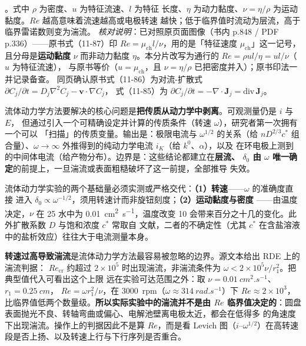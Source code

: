 。式中 $\rho$ 为密度、$u$ 为特征流速、$l$ 为特征
长度、$\eta$ 为动力黏度、$\nu=\eta/\rho$ 为运动黏度。$Re$ 越高意味着流速越高或电极转速
越快；低于临界值时流动为层流，高于临界雷诺数则变为湍流。
\emph{核对说明}：已对照原页面图像（书内 p.848 / PDF p.336）——原书式（11-87）印
$Re=\mu_{\mathrm{ch}}l/\nu$，用的是「特征速度 $\mu_{\mathrm{ch}}$」这一记号，且分母是\textbf{运动黏度}
$\nu$ 而非动力黏度 $\eta$。本分片改写为通行的 $Re=\rho ul/\eta=ul/\nu$（$u$ 为特征流速），
与原书等价（$u=\mu_{\mathrm{ch}}$，且 $\nu=\eta/\rho$ 已把密度并入）；原书印法一并记录备查。
同页确认原书式（11-86）为对流-扩散式 $\partial C_j/\partial t=D_j\nabla^2C_j-\mathbf{v}\cdot\nabla C_j$，
式（11-85）为 $\partial C_j/\partial t=-\nabla\cdot\mathbf{J}_j=\mathrm{div}\,\mathbf{J}_j$。

\begin{probout}
流体动力学方法要解决的核心问题是\textbf{把传质从动力学中剥离}。可观测量仍是 $i$ 与 $E$，
但通过引入一个可精确设定并计算的传质条件（转速 $\omega$），研究者第一次拥有一个可以
「扫描」的传质变量。输出是：极限电流与 $\omega^{1/2}$ 的关系（给 $nD^{2/3}c^{*}$
组合量）、$\omega\to\infty$ 外推得到的纯动力学电流 $i_K$（给 $k^{0}$、$\alpha$），以及
在环电极上测到的中间体电流（给产物分布）。边界是：这些结论都建立在\textbf{层流、
$\delta_0$ 由 $\omega$ 唯一确定}的前提上，一旦湍流或表面粗糙破坏了这一前提，全部推导
失效。
\end{probout}

\begin{measure}
流体动力学实验的两个基础量必须实测或严格交代：\textbf{（1）转速}——$\omega$ 的准确度直接
进入 $\delta_0\propto\omega^{-1/2}$，须用转速计而非旋钮刻度；\textbf{（2）运动黏度与密度}
——由温度决定，$\nu$ 在 \qty{25}{\degC} 水中为 \qty{0.01}{cm^2.s^{-1}}，温度改变
\qty{10}{\degC} 会带来百分之十几的变化。此外扩散系数 $D$ 与饱和浓度 $c^{*}$ 常取自
文献，二者的不确定性（尤其 $c^{*}$ 在含盐溶液中的盐析效应）往往大于电流测量本身。
\end{measure}

\begin{pitfall}
\textbf{转速过高导致湍流}是流体动力学方法最容易被忽略的边界。源文本给出 RDE 上的湍流判据：
$Re_{\mathrm{cr}}$ 约超过 $2\times10^{5}$ 时出现湍流，非湍流条件为
$\omega<2\times10^{5}\nu/r_1^{2}$。把典型值代入可看出这个上限
远在实验可达范围之外：取 $\nu=\qty{0.01}{cm^2.s^{-1}}$、$r_1=\qty{0.25}{cm}$，
$Re=\omega r_1^{2}/\nu$，在 \qty{3000}{rpm}（$\omega\approx\qty{314}{rad.s^{-1}}$）下
$Re\approx2\times10^{3}$，比临界值低两个数量级。\textbf{所以实际实验中的湍流并不是由
$Re$ 临界值决定的}：圆盘表面抛光不良、转轴弯曲或偏心、电解池壁离电极太近，都会在低得多
的角速度下出现湍流。操作上的判据因此不是算 $Re$，而是看
Levich 图（$i$–$\omega^{1/2}$）在高转速段是否上扬、以及转速上行与下行序列是否重合。
\end{pitfall}

